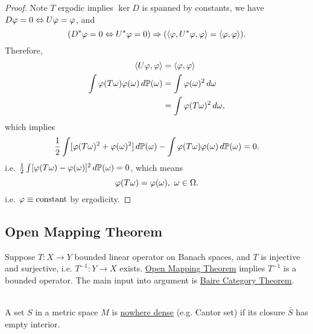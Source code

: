 \begin{proof}
\np Note $T$ ergodic implies $\ker{D}$ is spanned by constants, we have $D \varphi = 0 \Leftrightarrow U\varphi = \varphi$, and
\begin{equation*}
    (D^* \varphi = 0 \Leftrightarrow U^* \varphi = 0) \Rightarrow (\left\langle \varphi, U^* \varphi, \varphi \right\rangle = \left\langle \varphi, \varphi \right\rangle). 
\end{equation*}
Therefore,
\begin{align*}
    \left\langle U \varphi, \varphi \right\rangle &= \left\langle \varphi, \varphi \right\rangle\\
    \int \varphi(T \omega) \varphi(\omega) \,d\mathbb{P}(\omega) &=\int \varphi(\omega)^2 \,d\omega\\
    &= \int \varphi(T \omega)^2 \,d\omega,
\end{align*}
which implies
\begin{equation*}
    \frac{1}{2} \int [\varphi(T \omega)^2 + \varphi(\omega)^2] \,d\mathbb{P}(\omega) - \int \varphi(T \omega) \varphi(\omega) \,d\mathbb{P}(\omega) = 0.
\end{equation*}
i.e. $\frac{1}{2} \int[\varphi(T \omega) - \varphi(\omega)]^2 \,d\mathbb{P}(\omega) = 0$, which means
\begin{equation*}
    \varphi(T \omega) = \varphi(\omega),\ \omega \in \Omega.
\end{equation*}
i.e. $\varphi \equiv \text{constant}$ by ergodicity.
\end{proof}

\vspace{12pt}
\subsection{Open Mapping Theorem}

\np Suppose $T: X \to Y$ bounded linear operator on Banach spaces, and $T$ is injective and surjective, i.e. $T^{-1}: Y \to X$ exists. \underline{Open Mapping Theorem} implies $T^{-1}$ is a bounded operator. The main input into argument is \underline{Baire Category Theorem}. 

\begin{definition}\ \\
A set $S$ in a metric space $M$ is \underline{nowhere dense} (e.g. Cantor set) if its closure $\bar{S}$ has empty interior. 
\end{definition}









